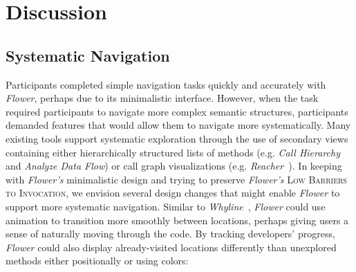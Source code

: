 \documentclass[conference]{IEEEtran}
\begin{document}


\section{Discussion}

\subsection{Systematic Navigation}
Participants completed simple navigation tasks quickly and accurately with \textit{Flower}, perhaps due to its minimalistic interface.
However, when the task required participants to navigate more complex semantic structures, participants demanded features that would allow them to navigate more systematically.
Many existing tools support systematic exploration through the use of secondary views containing either hierarchically structured lists of methods (e.g. \textit{Call Hierarchy} and \textit{Analyze Data Flow}) or call graph visualizations (e.g. \textit{Reacher~\cite{Reacher}}).
In keeping with \textit{Flower's} minimalistic design and trying to preserve \textit{Flower's} \textsc{Low Barriers to Invocation}, we envision several design changes that might enable \textit{Flower}  to support more systematic navigation.
Similar to \emph{Whyline}~\cite{Whyline}, \textit{Flower}  could use animation to transition more smoothly between locations, perhaps giving users a sense of naturally moving through the code.
By tracking developers' progress, \textit{Flower} could also display already-visited locations differently than unexplored methods either positionally or using colors:
\end{document}
